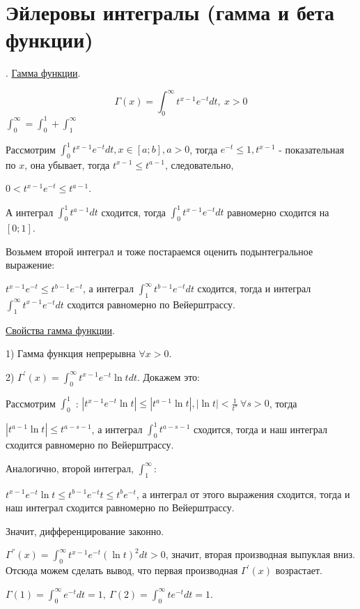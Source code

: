 \documentclass[12pt]{article}
\begin{document}
\section{Эйлеровы интегралы (гамма и бета функции)}
. \uline{Гамма функции}.\par
$$\Gamma (x) = \int_0^{\infty} t^{x-1} e^{-t} dt, \ x>0$$
$\int_0^{\infty} = \int_0^1 + \int_1^\infty$\par
Рассмотрим $\int_0^1 t^{x-1} e^{-t} dt, x\in [a;b], a > 0$, тогда $e^{-t} \leq 1, t^{x-1}$ - показательная по $x$, она убывает, тогда $t^{x-1} \leq t^{a-1}$, следовательно,\par
$0 < t^{x-1} e^{-t} \leq t^{a-1}$.\par
А интеграл $\int_0^1 t^{a-1} dt$ сходится, тогда $\int_0^1 t^{x-1} e^{-t} dt$ равномерно сходится на $[0;1]$.\par
Возьмем второй интеграл и тоже постараемся оценить подынтегральное выражение:\par
$t^{x-1}e^{-t} \leq t^{b-1} e^{-t}$, а интеграл $\int_1^{\infty} t^{b-1} e^{-t} dt$ сходится, тогда и интеграл $\int_1^{\infty} t^{x-1} e^{-t} dt$ сходится равномерно по Вейерштрассу.\par
\uline{Свойства гамма функции}.\par
1) Гамма функция непрерывна $\forall x > 0$.\par
2) $\Gamma^{'} (x) = \int_0^{\infty} t^{x-1} e^{-t} \ln{t} dt$. Докажем это:\par
Рассмотрим $\int_0^1$ : $|t^{x-1} e^{-t} \ln{t}| \leq |t^{a-1} \ln{t}|, |\ln{t}| < \frac{1}{t^s} \ \forall s > 0$, тогда\par
$|t^{a-1} \ln{t} | \leq t^{a-s-1}$, а интеграл $\int_0^1 t^{a-s-1}$ сходится, тогда и наш интеграл сходится равномерно по Вейерштрассу.\par
Аналогично, второй интеграл, $\int_1^{\infty}$:\par
$t^{x-1} e^{-t} \ln{t} \leq t^{b-1} e^{-t} t \leq t^{b} e^{-t}$, а интеграл от этого выражения сходится, тогда и наш интеграл сходится равномерно по Вейерштрассу.\par
Значит, дифференцирование законно.\par
$\Gamma^{''}(x) = \int_0^{\infty} t^{x-1} e^{-t} (\ln{t})^2 dt > 0$, значит, вторая производная выпуклая вниз. Отсюда можем сделать вывод, что первая производная $\Gamma^{'} (x)$ возрастает.\par
$\Gamma(1) = \int_0^{\infty} e^{-t} dt = 1, \ \Gamma(2) = \int_0^\infty t e^{-t} dt = 1$.\par
\end{document}
